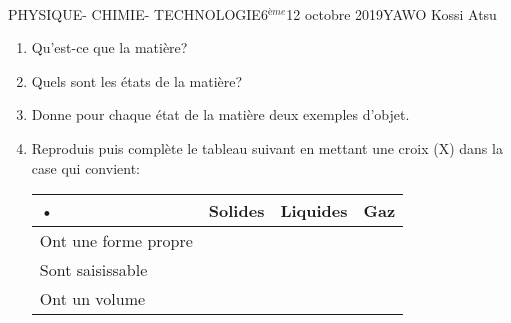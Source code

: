 \documentclass[12pt,a4paper]{book}
\newcommand{\prof}{YAWO Kossi Atsu}
\newcommand{\matiere}{\\PHYSIQUE- CHIMIE- TECHNOLOGIE}
\newcommand{\classe}{6$^{ème}$}
\begin{document}
\begin{td}{\matiere}{\classe}{12 octobre 2019}{\prof}
\begin{exo}
\begin{enumerate}
\item Qu'est-ce que la matière?
\item Quels sont les états de la matière?
\item Donne pour chaque état de la matière deux exemples d'objet.
\item Reproduis puis complète le tableau suivant en mettant une croix (X) dans la case qui convient:
\begin{tabular}{|p{4cm}|p{4cm}|p{4cm}|p{4cm}|}
\hline
• & Solides & Liquides & Gaz \\  
\hline 
Ont une forme propre &  &  &  \\ 
\hline 
Sont saisissable &  &  &  \\ 
\hline 
Ont un volume &  &  &  \\ 
\hline 
\end{tabular} 
\end{enumerate}
\end{exo}
\end{td}
\end{document}
